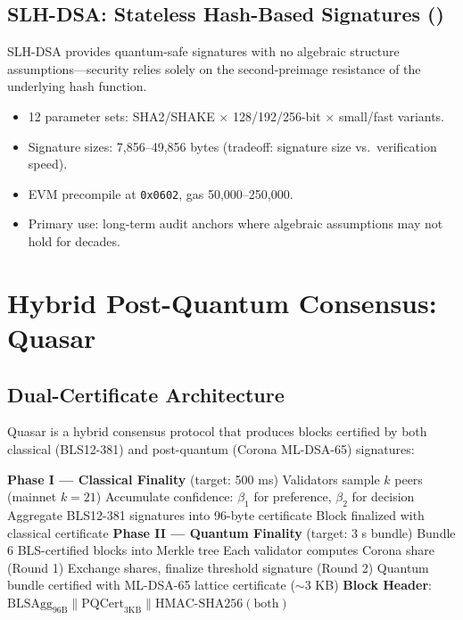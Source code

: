 \documentclass[11pt,letterpaper]{article}
\begin{document}
\subsection{SLH-DSA: Stateless Hash-Based Signatures ()}

SLH-DSA provides quantum-safe signatures with no algebraic structure assumptions---security relies solely on the second-preimage resistance of the underlying hash function.

\begin{itemize}
\item 12 parameter sets: SHA2/SHAKE $\times$ 128/192/256-bit $\times$ small/fast variants.
\item Signature sizes: 7,856--49,856 bytes (tradeoff: signature size vs.\ verification speed).
\item EVM precompile at \texttt{0x0602}, gas 50,000--250,000.
\item Primary use: long-term audit anchors where algebraic assumptions may not hold for decades.
\end{itemize}

\section{Hybrid Post-Quantum Consensus: Quasar}

\subsection{Dual-Certificate Architecture}

Quasar is a hybrid consensus protocol that produces blocks certified by both classical (BLS12-381) and post-quantum (Corona ML-DSA-65) signatures:

\begin{algorithm}[H]
\caption{Quasar Dual-Certificate Block Finalization}
\begin{algorithmic}[1]
\State \textbf{Phase I --- Classical Finality} (target: 500 ms)
\State Validators sample $k$ peers (mainnet $k=21$)
\State Accumulate confidence: $\beta_1$ for preference, $\beta_2$ for decision
\State Aggregate BLS12-381 signatures into 96-byte certificate
\State Block finalized with classical certificate
\Statex
\State \textbf{Phase II --- Quantum Finality} (target: 3 s bundle)
\State Bundle 6 BLS-certified blocks into Merkle tree
\State Each validator computes Corona share (Round 1)
\State Exchange shares, finalize threshold signature (Round 2)
\State Quantum bundle certified with ML-DSA-65 lattice certificate ($\sim$3 KB)
\Statex
\State \textbf{Block Header}: $\text{BLSAgg}_{96\text{B}} \| \text{PQCert}_{3\text{KB}} \| \text{HMAC-SHA256}(\text{both})$
\end{algorithmic}
\end{algorithm}
\end{document}
